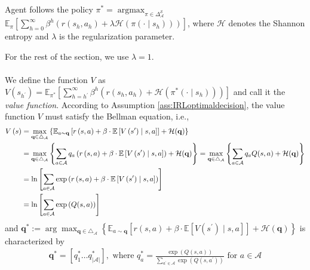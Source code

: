 \begin{asmp} Agent follows the policy $\pi^*=\operatorname{argmax}_{\pi \in \Delta_{\mathcal{A}}^{\mathcal{S}}}$
$\mathbb{E}_\pi\left[\sum_{h=0}^{\infty} \beta^h \left(r\left(s_h, a_h\right)+\lambda\mathcal{H}\left(\pi\left(\cdot \mid s_h\right)\right)\right)\right]$, where $\mathcal{H}$ denotes the Shannon entropy and $\lambda$ is the regularization parameter.
\end{asmp}
For the rest of the section, we use $\lambda=1$.
\\
\;
\\
We define the function $V$ as $V(s_{h^\prime})=\mathbb{E}_{\pi^*}\left[\sum_{h=h^\prime}^{\infty} \beta^{h} \left(r\left(s_h, a_h\right)+\mathcal{H}\left(\pi^*\left(\cdot \mid s_h\right)\right)\right)\right]$ and call it the \textit{value function}. According to Assumption \ref{ass:IRLoptimaldecision}, the value function $V$ must satisfy the Bellman equation, i.e., 
\begin{align}
V\left(s\right)&=\max _{\mathbf{q} \in \triangle_\mathcal{A}}\left\{\mathbb{E}_{a\sim\mathbf{q} }\left[r\left(s, a\right)+\beta \cdot \mathbb{E}\left[V\left(s^\prime\right)\mid s, a\right]\right]+\mathcal{H}(\mathbf{q})\right\}\notag
\\
&=\max _{\mathbf{q} \in \triangle_\mathcal{A}}\left\{\sum_{a\in \mathcal{A}} q_a\left(r\left(s, a\right)+\beta \cdot \mathbb{E}\left[V\left(s^\prime\right)\mid s, a\right]\right)+\mathcal{H}(\mathbf{q})\right\}=\max _{\mathbf{q} \in \triangle_\mathcal{A}}\left\{\sum_{a\in \mathcal{A}} q_a Q(s,a)+\mathcal{H}(\mathbf{q})\right\}\label{eq:VandmaxQ}
\\
&=\ln \left[\sum_{a\in \mathcal{A}}\exp\left(r\left(s, a\right)+\beta \cdot \mathbb{E}\left[{V}\left(s^\prime\right)\mid s, a\right]\right)\right]\label{eq:logsumexp_reg}
\\
&=\ln \left[\sum_{a\in \mathcal{A}}\exp\left(Q(s, a)\right)\right]\label{eq:IRLlogsumQ}
\end{align}
and $\mathbf{q}^*:=\arg\max_{\mathbf{q} \in \triangle_\mathcal{A}} \left\{\mathbb{E}_{a\sim\mathbf{q} }\left[r\left(s, a\right)+\beta \cdot \mathbb{E}\left[V\left(s^\prime\right)\mid s, a\right]\right]+\mathcal{H}(\mathbf{q})\right\}$ is characterized by
\\
\begin{align}
\mathbf{q}^* = [q_1^* \ldots q^*_{|\mathcal{A}|}], \text{ where }
    q^*_a= \frac{\exp \left({Q(s, a)}\right)}{\sum_{a^\prime\in \mathcal{A}} \exp \left({Q(s, a^\prime)}\right)} \text{ for } a\in \mathcal{A}  \label{eq:IRLopt}
\end{align}
